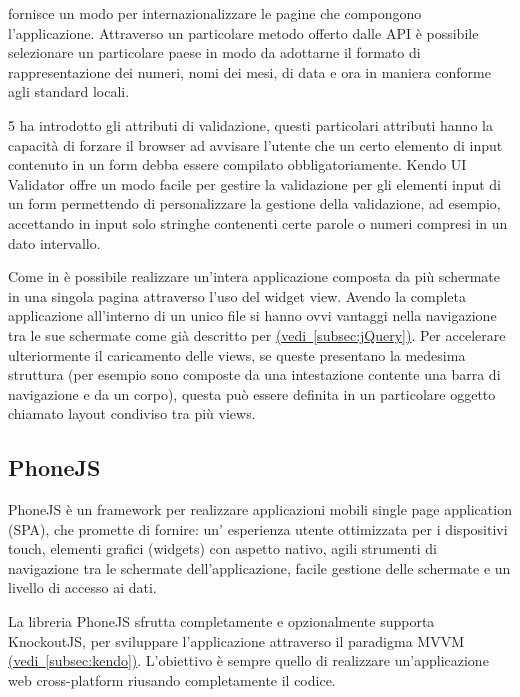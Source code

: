             \kendomob{} fornisce un modo per internazionalizzare le pagine che
            compongono l'applicazione. Attraverso un particolare metodo offerto
            dalle API è possibile selezionare un particolare paese in modo da
            adottarne il formato di rappresentazione dei numeri, nomi dei mesi,
            di data e ora in maniera conforme agli standard locali.

            \html{}5 ha introdotto gli attributi di validazione, questi particolari
            attributi hanno la capacità di forzare il browser ad avvisare
            l'utente che un certo elemento di input contenuto in un form debba
            essere compilato obbligatoriamente. Kendo UI Validator offre un modo
            facile per gestire la validazione per gli elementi input di un form
            permettendo di personalizzare la gestione della validazione, ad
            esempio, accettando in input solo stringhe contenenti certe parole o
            numeri compresi in un dato intervallo.

            Come in \jqm{} è possibile realizzare un'intera applicazione
            composta da più schermate in una singola pagina \html{} attraverso l'uso
            del widget view. Avendo la completa applicazione all'interno di un
            unico file si hanno ovvi vantaggi nella navigazione tra le sue schermate
            come già descritto per \jqm{}
            \hyperref[subsec:jQuery]{(vedi~\ref{subsec:jQuery})}.
            Per accelerare ulteriormente il caricamento delle views, se queste
            presentano la medesima struttura (per esempio sono composte da una
            intestazione contente una barra di navigazione e da un corpo),
            questa può essere definita in un particolare oggetto chiamato layout
            condiviso tra più views.

        \subsection{PhoneJS}
            PhoneJS è un frame\-work per realizzare applicazioni mobili
            single page application (SPA), che promette di fornire: un'
            esperienza utente ottimizzata per i dispositivi touch, elementi
            grafici (widgets) con
            aspetto nativo, agili strumenti di navigazione tra le schermate
            dell'applicazione, facile gestione delle schermate e un livello di
            accesso ai dati.

            La libreria PhoneJS sfrutta completamente \jq{} e opzionalmente
            supporta KnockoutJS, per sviluppare l'applicazione attraverso il paradigma
            MVVM \hyperref[subsec:kendo]{(vedi~\ref{subsec:kendo})}.
            L'obiettivo è sempre quello di realizzare un'applicazione web cross-platform
            riusando completamente il codice.

